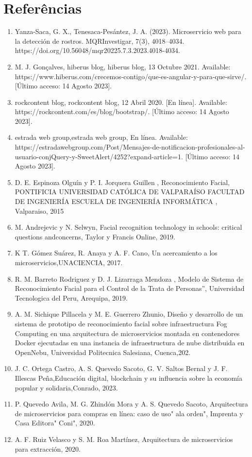 \documentclass[12pt]{article}
\begin{document}
\section{Referências}
{\begin{enumerate}
    \item Yanza-Saca, G. X., Tenesaca-Pesántez, J. A. (2023). Microservicio web para la detección de rostros. MQRInvestigar, 7(3), 4018–4034. https://doi.org/10.56048/mqr20225.7.3.2023.4018-4034.
    \item M. J. Gonçalves, hiberus blog, hiberus blog, 13 Octubre 2021. Available:
    https://www.hiberus.com/crecemos-contigo/que-es-angular-y-para-que-sirve/. [Último acceso:
    14 Agosto 2023].
    \item rockcontent blog, rockcontent blog, 12 Abril 2020. [En línea]. Available:
    https://rockcontent.com/es/blog/bootstrap/. [Último acceso: 14 Agosto 2023].
    \item estrada web group,estrada web group, En línea. Available:
    https://estradawebgroup.com/Post/Mensajes-de-notificacion-profesionales-al-usuario-conjQuery-y-SweetAlert/4252?expand-article=1. [Último acceso: 14 Agosto 2023].
    \item D. E. Espinoza Olguín y P. I. Jorquera Guillen , Reconocimiento Facial, PONTIFICIA UNIVERSIDAD CATÓLICA DE VALPARAÍSO FACULTAD DE INGENIERÍA ESCUELA DE INGENIERÍA INFORMÁTICA , Valparaiso, 2015
    \item M. Andrejevic y N. Selwyn, Facial recognition technology in schools: critical questions andconcerns, Taylor y Francis Online, 2019.
    
    \item K T. Gómez Suárez, R. Anaya y A. F. Cano, Un acercamiento a los microservicios,UNACIENCIA, 2017.
    \item R. M. Barreto Rodriguez y D. J. Lizarraga Mendoza , Modelo de Sistema de Reconocimiento Facial para el Control de la Trata de Personas”, Universidad Tecnologica del Peru, Arequipa, 2019.
    \item A. M. Sichique Pillacela y M. E. Guerrero Zhunio, Diseño y desarrollo de un sistema de prototipo de reconocimiento facial sobre infraestructura Fog Computing en una arquitectura de microservicios montada en contenedores Docker ejecutadas en una instancia de infraestructura de nube distribuida en OpenNebu, Universidad Politecnica Salesiana, Cuenca,202.

    \item J. C. Ortega Castro, A. S. Quevedo Sacoto, G. V. Saltos Bernal y J. F. Illescas Peña,Educación digital, blockchain y su influencia sobre la economía popular y solidaria,Conrado, 2023.
    \item P. Quevedo Avila, M. G. Zhindón Mora y A. S. Quevedo Sacoto, Arquitectura de microservicios para compras en línea: caso de uso" ala orden", Imprenta y Casa Editora" Coni", 2020.
    \item  A. F. Ruiz Velasco y S. M. Roa Martínez, Arquitectura de microservicios para extracción, 2020.
    
\end{enumerate}}
\end{document}
